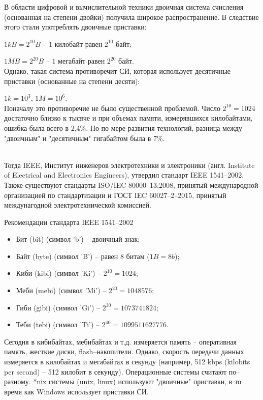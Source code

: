 В области цифровой и вычислительной техники двоичная система счисления (основанная на степени двойки) получила широкое распространение. В следствие этого стали употреблять двоичные приставки:
\item $1 kB = 2^{10} B$ -- $1$ килобайт равен $2^{10}$ байт;
\item $1 MB = 2^{20} B$ -- $1$ мегабайт равен $2^{20}$ байт.
\\Однако, такая система противоречит СИ, которая использует десятичные приставки (основанные на степени десяти):
\item $1 k = 10^{3}$, $1 M = 10^{6}$.
\\Поначалу это противоречие не было существенной проблемой. Число $2^{10} = 1024$ достаточно близко к тысяче и при объемах памяти, измерявшихся килобайтами, ошибка была всего в 2,4\%. Но по мере развития технологий, разница между "двоичным" и "десятичным" гигабайтом была в 7\%.

\\Тогда IEEE, Институт инженеров электротехники и электроники (англ. Institute of Electrical and Electronics Engineers), утвердил стандарт IEEE 1541--2002. Также существуют стандарты  ISO/IEC 80000--13:2008, принятый международной организацией по стандартизации и ГОСТ IEC 60027--2--2015, принятый междунагодной электротехнической комиссией.
\\
\begin{center}
Рекомендации стандарта IEEE 1541--2002
\end{center}
\begin{itemize}
\item Бит (bit) (символ 'b') -- двоичный знак;
\item Байт (byte) (символ 'B') -- равен 8 битам ($1B = 8b$);
\item Киби (kibi) (символ 'Ki') -- $2^{10} = 1024$;
\item Меби (mebi) (символ 'Mi') -- $2^{20} = 1048576$;
\item Гиби (gibi) (символ 'Gi') -- $2^{30} = 1073741824$;
\item Теби (tebi) (символ 'Ti') -- $2^{40} = 1099511627776$.
\end{itemize}

Сегодня в кибибайтах, мебибайтах и т.д. измеряется память -- оперативная память, жесткие диски, flash--накопители. Однако, скорость передачи данных измеряется в килобайтах и мегабайтах в секунду (например, 512 kbps (kilobits per second) -- 512 килобит в секунду).
Операционные системы считают по--разному. *nix системы (unix, linux) используют "двоичные" приставки, в то время как Windows использует приставки СИ. 